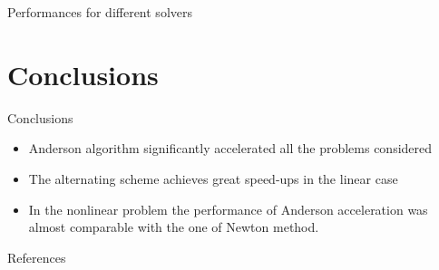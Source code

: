 \documentclass{beamer}
\begin{document}
				\begin{frame}{Performances for different solvers}
			\begin{figure}
			{\scriptsize
			}
			\centering
			\end{figure}

				\end{frame}
				
				\section{Conclusions}
				\begin{frame}{Conclusions}
					\begin{itemize}
					\item	Anderson algorithm significantly accelerated all the problems considered
					\item The alternating scheme achieves great speed-ups in the linear case
					\item In the nonlinear problem the performance of Anderson acceleration was almost
						comparable with the one of Newton method.
					\end{itemize}
				\end{frame}
				
				\begin{frame}{References}
					\printbibliography[heading=bibintoc]
				\end{frame}
				
			
			
\end{document}
